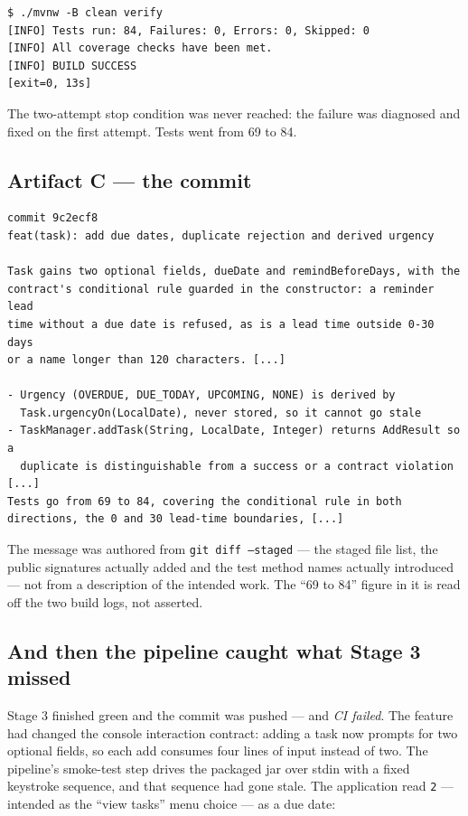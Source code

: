 \documentclass[11pt,a4paper]{article}
\newcommand{\code}[1]{\texttt{\small #1}}
\begin{document}
\begin{lstlisting}[style=plain]
$ ./mvnw -B clean verify
[INFO] Tests run: 84, Failures: 0, Errors: 0, Skipped: 0
[INFO] All coverage checks have been met.
[INFO] BUILD SUCCESS
[exit=0, 13s]
\end{lstlisting}

\noindent The two-attempt stop condition was never reached: the failure was
diagnosed and fixed on the first attempt. Tests went from 69 to 84.

\subsection{Artifact C --- the commit}

\begin{lstlisting}[style=plain]
commit 9c2ecf8
feat(task): add due dates, duplicate rejection and derived urgency

Task gains two optional fields, dueDate and remindBeforeDays, with the
contract's conditional rule guarded in the constructor: a reminder lead
time without a due date is refused, as is a lead time outside 0-30 days
or a name longer than 120 characters. [...]

- Urgency (OVERDUE, DUE_TODAY, UPCOMING, NONE) is derived by
  Task.urgencyOn(LocalDate), never stored, so it cannot go stale
- TaskManager.addTask(String, LocalDate, Integer) returns AddResult so a
  duplicate is distinguishable from a success or a contract violation
[...]
Tests go from 69 to 84, covering the conditional rule in both
directions, the 0 and 30 lead-time boundaries, [...]
\end{lstlisting}

\noindent The message was authored from \code{git diff --staged} --- the staged
file list, the public signatures actually added and the test method names
actually introduced --- not from a description of the intended work. The
``69 to 84'' figure in it is read off the two build logs, not asserted.

\subsection{And then the pipeline caught what Stage 3 missed}

Stage 3 finished green and the commit was pushed --- and \emph{CI failed}. The
feature had changed the console interaction contract: adding a task now prompts
for two optional fields, so each add consumes four lines of input instead of
two. The pipeline's smoke-test step drives the packaged jar over stdin with a
fixed keystroke sequence, and that sequence had gone stale. The application
read \code{2} --- intended as the ``view tasks'' menu choice --- as a due date:
\end{document}
